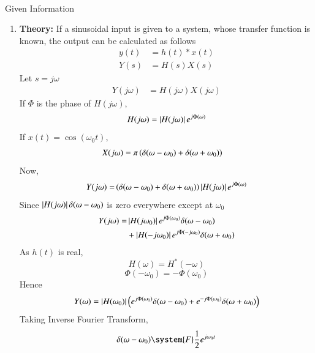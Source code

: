 \documentclass[journal,12pt,twocolumn]{IEEEtran}
\theoremstyle{remark}
\begin{document}
\solution \\
\begin{table}[h]
    \centering
    
    \caption{Given Information} 
    \label{37.Gate22.EE.tab: 1}                                                                                                                                                                                                 
\end{table}
\begin{enumerate}
\item \textbf{Theory: } If a sinusoidal input is given to a system, whose transfer function is known, the output can be calculated as follows
\begin{align}
    y(t)&=h(t)*x(t)\\
    Y(s)&=H(s)X(s)
\end{align}
Let $s=j\omega$
\begin{align}
    Y(j\omega)&=H(j\omega)X(j\omega)
\end{align}
If $\Phi$ is the phase of $H(j\omega)$, 
\begin{align}
    H(j\omega)=\left\vert H(j\omega)\right\vert e^{j\Phi(\omega)}
\end{align}
If $x(t)=\cos{(\omega_0t)}$, 
\begin{align}
    X(j\omega)&=\pi \left(\delta(\omega-\omega_0)+\delta(\omega+\omega_0)\right)
\end{align}
Now,
\begin{align}
    Y(j\omega)=&\left(\delta(\omega-\omega_0)+\delta(\omega+\omega_0)\right)\left\vert H(j\omega)\right\vert e^{j\Phi(\omega)}\\
\end{align}
Since $\left\vert H(j\omega)\right\vert\delta(\omega-\omega_0)$ is zero everywhere except at $\omega_0$ 
\begin{align}
    Y(j\omega)=&\left\vert H(j\omega_0)\right\vert e^{j\Phi(\omega_0)}\delta(\omega-\omega_0) \\&+ \left\vert H(-j\omega_0)\right\vert e^{j\Phi(-j\omega_0)}\delta(\omega+\omega_0)
\end{align}
As $h(t)$ is real, $${H(\omega)}={H^{*}(-\omega)}$$ 
 $$\Phi(-\omega_0)=-\Phi(\omega_0)$$
Hence 
 \begin{align}
    Y(\omega)= \left\vert H(\omega_0)\right\vert\left(e^{j\Phi(\omega_0)}\delta(\omega-\omega_0) + e^{-j\Phi(\omega_0)}\delta(\omega+\omega_0)\right)
\end{align}
Taking Inverse Fourier Transform, 
\begin{align}
    \delta(\omega-\omega_0) \system{F} \frac{1}{2}e^{j\omega_0t}\\

\end{align}
\end{enumerate}
\end{document}

